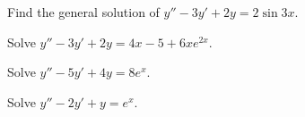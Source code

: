   \begin{example}
    Find the general solution of \(y'' - 3y' + 2y = 2 \sin{3x}\).
  \end{example}


  \begin{example}
    Solve \(y'' - 3y' + 2y = 4x - 5 + 6xe^{2x}\).
  \end{example}


  \begin{example}
    Solve \(y'' - 5y' + 4y = 8e^{x}\).
  \end{example}


  \begin{example}
    Solve \(y'' - 2y' + y = e^{x}\).
  \end{example}


